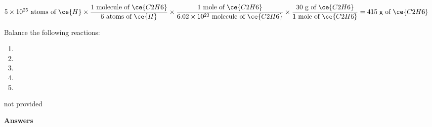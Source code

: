 \documentclass[main.tex]{subfiles}
\begin{document}
\begin{multicols*}{2}
\begin{solution}
$
5\times 10^{25} \text{ atoms of }\ce{H}
\times 
\dfrac{ 1 \text{ molecule of }\ce{C2H6} }
{  6\text{ atoms of }\ce{H}   }
\times
\dfrac{1 \text{ mole of }\ce{C2H6}  }
{ 6.02\times 10^{23} \text{ molecule of }\ce{C2H6}} 
\times
\dfrac{30 \text{ g of }\ce{C2H6} }
{1 \text{ mole of }\ce{C2H6} }
= 415  \text{ g of }\ce{C2H6}
$
\hspace{0.1cm}\end{solution}%
\begin{question}[ID=\the\value{numA}]
Balance the following reactions:
\noindent
  \begin{enumerate} [topsep=0pt, partopsep=1pt, label=(\alph*), leftmargin=0.5cm]	
\item	{}
\item	{}
\item	{}
\item	{}
\item	{}
\end{enumerate}
\end{question}\begin{solution}
not provided\hspace{0.1cm}\end{solution}


\end{multicols*}
\newpage
\begin{answersenvironment}
\begin{minipage}[c]{1\textwidth}
\begin{localsize}{10}
{\Large \bf Answers}
\printsolutions[byID={1,3,5,7,9,11,13,15,17,19,21,23,25,27,29,31, 33, 35 }]
\end{localsize}
\end{minipage}\end{answersenvironment}
\end{document}
